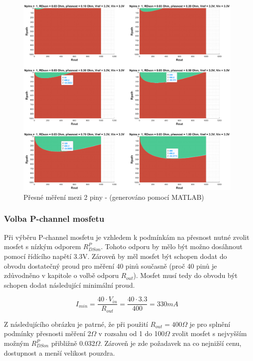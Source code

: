 \begin{figure}[ht!]
    \centering
    \includegraphics[width = 1\textwidth]{obrazky/MERENI_JEDNOHO_PINU.eps}
    \caption{Přesné měření mezi 2 piny - (generováno pomocí MATLAB)}
    \label{fig:One pin MEASUREMENT}
\end{figure}
\clearpage



\subsubsection{Volba P-channel mosfetu}
Při výběru P-channel mosfetu je vzhledem k podmínkám na přesnost nutné zvolit mosfet s nízkým odporem $R^P_{DSon}$.
Tohoto odporu by mělo být možno dosáhnout pomocí řídícího napětí 3.3V.
Zároveň by měl mosfet být schopen dodat do obvodu dostatečný proud pro měření 40 pinů současně (proč 40 pinů je zdůvodněno v kapitole
o volbě odporu $R_{out}$). Mosfet musí tedy do obvodu být schopen dodat následující minimální proud.

\begin{equation} \label{eq:MIN_CURRENT}
    I_{min} = \frac{40 \cdot V_{in}}{R_{out}} = \frac{40 \cdot 3.3}{400} = 330mA
\end{equation}

 Z následujícího obrázku je patrné, že při použití $R_{out} = 400\Omega$ je pro splnění podmínky přesnosti měření 2$\Omega$ v rozsahu od 1 do 100$\Omega$ zvolit mosfet s
 nejvyšším možným $R^P_{DSon}$ přibližně 0.032$\Omega$. Zároveň je zde požadavek na co nejnižší cenu, dostupnost a menší velikost pouzdra. 

